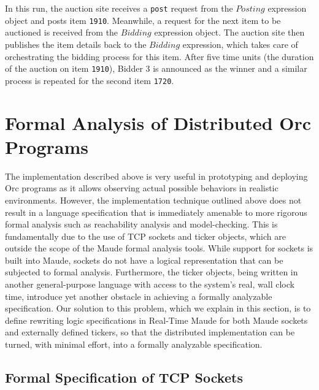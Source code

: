 \documentclass{eptcs}
\begin{document}
In this run, the auction site receives a \texttt{post} request from the $\mathit{Posting}$ expression object and posts item \texttt{1910}. Meanwhile, a request for the next item to be auctioned is received from  the $\mathit{Bidding}$ expression object. The auction site then publishes the item details back to the $\mathit{Bidding}$ expression, which takes care of orchestrating the bidding process for this item. After five time units (the duration of the auction on item \texttt{1910}), Bidder 3 is announced as the winner and a similar process is repeated for the second item \texttt{1720}.

\section{Formal Analysis of Distributed Orc Programs} \label{sec:formal-analysis}


The implementation described above is very useful in prototyping and deploying Orc programs as it allows observing actual possible behaviors in realistic environments. However, the implementation technique outlined above does not result in a language specification that is immediately amenable to more rigorous formal analysis such as reachability analysis and model-checking. This is fundamentally due to the use of TCP sockets and ticker objects, which are outside the scope of the Maude formal analysis tools. While support for sockets is built into Maude, sockets do not have a logical representation that can be subjected to formal analysis. Furthermore, the ticker objects, being written in another general-purpose language with access to the system's real, wall clock time, introduce yet another obstacle in achieving a formally analyzable specification. Our solution to this problem, which we explain in this section, is to define rewriting logic specifications in Real-Time Maude for both Maude sockets and externally defined tickers, so that the distributed implementation can be turned, with minimal effort, into a formally analyzable specification. 


\subsection{Formal Specification of TCP Sockets}
\end{document}
